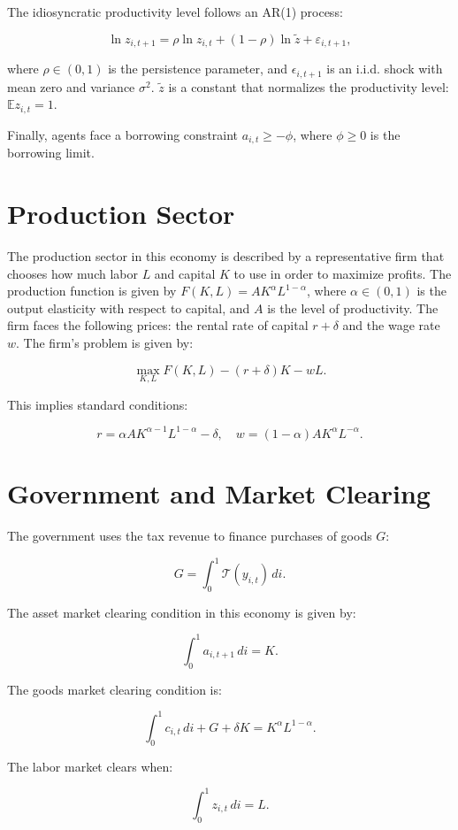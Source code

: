\documentclass{article}
\begin{document}
The idiosyncratic productivity level follows an AR(1) process:

\[
\ln z_{i,t+1} = \rho \ln z_{i,t} + (1 - \rho) \ln \tilde{z} + \varepsilon_{i,t+1},
\]

where \(\rho \in (0,1)\) is the persistence parameter, and \(\epsilon_{i,t+1}\) is an i.i.d. shock with mean zero and variance \(\sigma^{2}\). \(\tilde{z}\) is a constant that normalizes the productivity level: \(\mathbb{E} z_{i,t} = 1\).

Finally, agents face a borrowing constraint \(a_{i,t} \geq -\phi\), where \(\phi \geq 0\) is the borrowing limit.

\section*{Production Sector}
The production sector in this economy is described by a representative firm that chooses how much labor \(L\) and capital \(K\) to use in order to maximize profits. The production function is given by \(F(K,L) = A K^{\alpha} L^{1 - \alpha}\), where \(\alpha \in (0,1)\) is the output elasticity with respect to capital, and \(A\) is the level of productivity. The firm faces the following prices: the rental rate of capital \(r + \delta\) and the wage rate \(w\). The firm's problem is given by:

\[
\max_{K,L} F(K,L) - (r + \delta) K - w L.
\]

This implies standard conditions:

\[
r = \alpha A K^{\alpha - 1} L^{1 - \alpha} - \delta, \quad w = (1 - \alpha) A K^{\alpha} L^{-\alpha}.
\]

\section*{Government and Market Clearing}
The government uses the tax revenue to finance purchases of goods \(G\):

\[
G = \int_{0}^{1} \mathcal{T}(y_{i,t}) \, di.
\]

The asset market clearing condition in this economy is given by:

\[
\int_{0}^{1} a_{i,t+1} \, di = K.
\]

The goods market clearing condition is:

\[
\int_{0}^{1} c_{i,t} \, di + G + \delta K = K^{\alpha} L^{1 - \alpha}.
\]

The labor market clears when:

\[
\int_{0}^{1} z_{i,t} \, di = L.
\]
\end{document}

